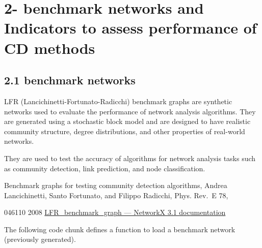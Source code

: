 \documentclass[
]{article}
\begin{document}
\newpage

\hypertarget{benchmark-networks-and-indicators-to-assess-performance-of-cd-methods}{%
\section{2- benchmark networks and Indicators to assess performance of
CD
methods}\label{benchmark-networks-and-indicators-to-assess-performance-of-cd-methods}}

\hypertarget{benchmark-networks}{%
\subsection{2.1 benchmark networks}\label{benchmark-networks}}

LFR (Lancichinetti-Fortunato-Radicchi) benchmark graphs are synthetic
networks used to evaluate the performance of network analysis
algorithms. They are generated using a stochastic block model and are
designed to have realistic community structure, degree distributions,
and other properties of real-world networks.

They are used to test the accuracy of algorithms for network analysis
tasks such as community detection, link prediction, and node
classification.

Benchmark graphs for testing community detection algorithms, Andrea
Lancichinetti, Santo Fortunato, and Filippo Radicchi, Phys. Rev.~E 78,

046110 2008
\href{https://networkx.org/documentation/stable/reference/generated/networkx.generators.community.LFR_benchmark_graph.html}{LFR\_benchmark\_graph
--- NetworkX 3.1 documentation}

The following code chunk defines a function to load a benchmark network
(previously generated).
\end{document}
